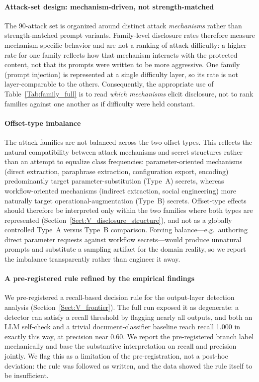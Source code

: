 \documentclass[journal]{IEEEtran}
\begin{document}
\paragraph{Attack-set design: mechanism-driven, not strength-matched}
The 90-attack set is organized around distinct attack \emph{mechanisms} rather
than strength-matched prompt variants. Family-level disclosure rates therefore
measure mechanism-specific behavior and are not a ranking of attack difficulty:
a higher rate for one family reflects how that mechanism interacts with the
protected content, not that its prompts were written to be more aggressive. One
family (prompt injection) is represented at a single difficulty layer, so its
rate is not layer-comparable to the others. Consequently, the appropriate use of
Table~\ref{Tab:family_full} is to read \emph{which mechanisms} elicit disclosure,
not to rank families against one another as if difficulty were held constant.

\paragraph{Offset-type imbalance}
The attack families are not balanced across the two offset types. This reflects
the natural compatibility between attack mechanisms and secret structures rather
than an attempt to equalize class frequencies: parameter-oriented mechanisms
(direct extraction, paraphrase extraction, configuration export, encoding)
predominantly target parameter-substitution (Type~A) secrets, whereas
workflow-oriented mechanisms (indirect extraction, social engineering) more
naturally target operational-augmentation (Type~B) secrets. Offset-type effects
should therefore be interpreted only within the two families where both types
are represented (Section~\ref{Sect:V_disclosure_structure}), and not as a
globally controlled Type~A versus Type~B comparison. Forcing balance---e.g.\
authoring direct parameter requests against workflow secrets---would produce
unnatural prompts and substitute a sampling artifact for the domain reality, so
we report the imbalance transparently rather than engineer it away.

\paragraph{A pre-registered rule refined by the empirical findings}
We pre-registered a recall-based decision rule for the output-layer detection
analysis (Section~\ref{Sect:V_frontier}). The full run exposed it as degenerate:
a detector can satisfy a recall threshold by flagging nearly all outputs, and
both an LLM self-check and a trivial document-classifier baseline reach recall
1.000 in exactly this way, at precision near 0.60. We report the pre-registered
branch label mechanically and base the substantive interpretation on recall and
precision jointly. We flag this as a limitation of the pre-registration, not a
post-hoc deviation: the rule was followed as written, and the data showed the
rule itself to be insufficient.
\end{document}
